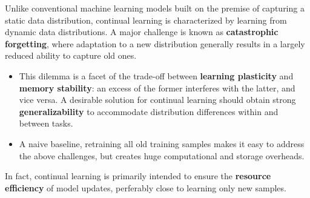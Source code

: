 \documentclass[10pt,dvipsnames]{beamer}
\begin{document}
\begin{frame}
    Unlike conventional machine learning models built on the premise of capturing a static data distribution, continual learning is characterized by learning from dynamic data distributions. A major challenge is known as \textbf{catastrophic forgetting}, where adaptation to a new distribution generally results in a largely reduced ability to capture old ones.
    \begin{itemize}
        \item This dilemma is a facet of the trade-off between \textbf{learning plasticity} and \textbf{memory stability}: an excess of the former interferes with the latter, and vice versa. A desirable solution for continual learning should obtain strong \textbf{generalizability} to accommodate distribution differences within and between tasks.
        \item A naive baseline, retraining all old training samples makes it easy to address the above challenges, but creates huge computational and storage overheads.
    \end{itemize}
    In fact, continual learning is primarily intended to ensure the \textbf{resource efficiency} of model updates, perferably close to learning only new samples.
\end{frame}
\end{document}
